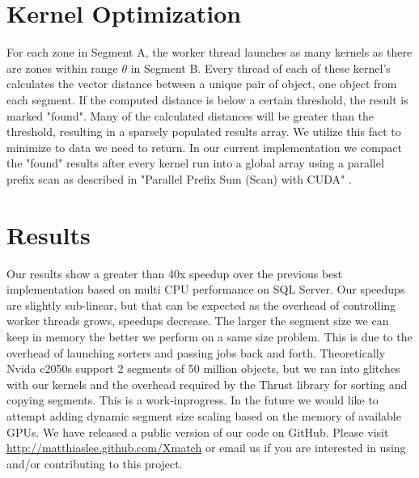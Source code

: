 \documentclass[11pt,twoside]{article}
\begin{document}
\section{Kernel Optimization}
For each zone in Segment A, the worker thread launches as many kernels as there are zones within range $\theta$ in Segment B. Every thread of each of these kernel's calculates the vector distance between a unique pair of object, one object from each segment. If the computed distance is below a certain threshold, the result is marked "found". Many of the calculated distances will be greater than the threshold, resulting in a sparsely populated results array. We utilize this fact to minimize to data we need to return. In our current implementation we compact the "found" results after every kernel run into a global array using a parallel prefix scan as described in "Parallel Prefix Sum (Scan) with CUDA" \citet{harris2007parallel}.

\section{Results}
Our results show a greater than 40x speedup over the previous best implementation based on multi CPU performance on SQL Server. Our speedups are slightly sub-linear, but that can be expected as the overhead of controlling worker threads grows, speedups decrease. The larger the segment size we can keep in memory the better we perform on a same size problem. This is due to the overhead of launching sorters and passing jobs back and forth. Theoretically Nvida c2050s support 2 segments of 50 million objects, but we ran into glitches with our kernels and the overhead required by the Thrust library for sorting and copying segments. This is a work-inprogress. In the future we would like to attempt adding dynamic segment size scaling based on the memory of available GPUs. We have released a public version of our code on GitHub. Please visit \url{http://matthiaslee.github.com/Xmatch} or email us if you are interested in using and/or contributing to this project.



\end{document}
